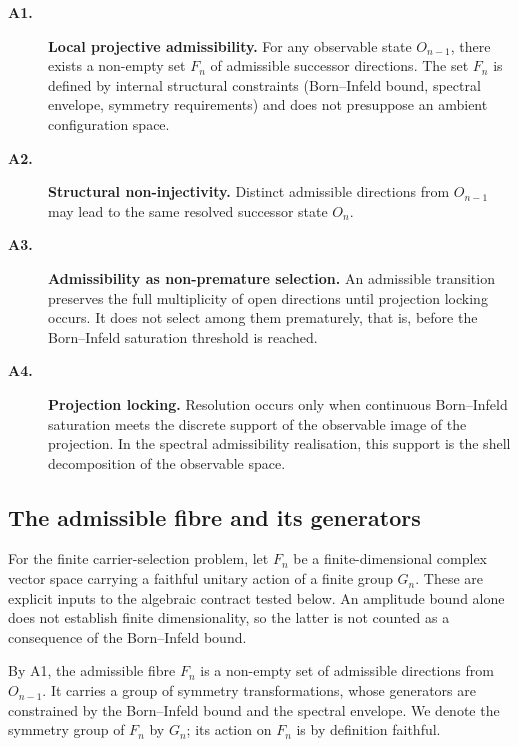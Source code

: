 \documentclass[11pt,a4paper]{article}
\begin{document}
    \begin{description}
      \item[\textbf{A1.}] \textbf{Local projective admissibility.}
      For any observable state $O_{n-1}$, there exists a non-empty set $F_n$ of
      admissible successor directions.
      The set $F_n$ is defined by internal structural constraints (Born--Infeld
      bound, spectral envelope, symmetry requirements) and does not presuppose
      an ambient configuration space.

      \item[\textbf{A2.}] \textbf{Structural non-injectivity.}
      Distinct admissible directions from $O_{n-1}$ may lead to the same resolved
      successor state $O_n$.

      \item[\textbf{A3.}] \textbf{Admissibility as non-premature selection.}
      An admissible transition preserves the full multiplicity of open directions
      until projection locking occurs.
      It does not select among them prematurely, that is, before the
      Born--Infeld saturation threshold is reached.

      \item[\textbf{A4.}] \textbf{Projection locking.}
      Resolution occurs only when continuous Born--Infeld saturation meets the
      discrete support of the observable image of the projection.
      In the spectral admissibility realisation, this support is the shell
      decomposition of the observable space.
    \end{description}

  \subsection{The admissible fibre and its generators}

    For the finite carrier-selection problem, let $F_n$ be a finite-dimensional
    complex vector space carrying a faithful unitary action of a finite group
    $G_n$.
    These are explicit inputs to the algebraic contract tested below.
    An amplitude bound alone does not establish finite dimensionality, so the
    latter is not counted as a consequence of the Born--Infeld bound.

    By A1, the admissible fibre $F_n$ is a non-empty set of admissible directions
    from $O_{n-1}$.
    It carries a group of symmetry transformations, whose generators are constrained
    by the Born--Infeld bound and the spectral envelope.
    We denote the symmetry group of $F_n$ by $G_n$; its action on $F_n$ is by
    definition faithful.
\end{document}
